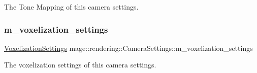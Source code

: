 The Tone Mapping of this camera settings. \hypertarget{classmage_1_1rendering_1_1_camera_settings_a4d4cc0955f6bac39a57382a15fe81d64}{}\label{classmage_1_1rendering_1_1_camera_settings_a4d4cc0955f6bac39a57382a15fe81d64} 
\subsubsection{\texorpdfstring{m\+\_\+voxelization\+\_\+settings}{m\_voxelization\_settings}}
{\footnotesize\ttfamily \hyperlink{classmage_1_1rendering_1_1_voxelization_settings}{Voxelization\+Settings} mage\+::rendering\+::\+Camera\+Settings\+::m\+\_\+voxelization\+\_\+settings\hspace{0.3cm}{\ttfamily [private]}}

The voxelization settings of this camera settings. 